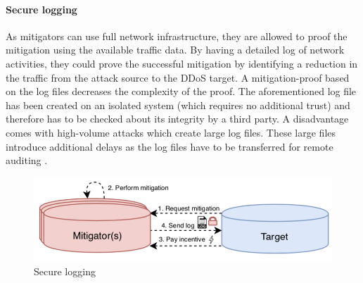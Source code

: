 \paragraph{Secure logging}
As mitigators can use full network infrastructure, they are allowed to proof the mitigation using the available traffic data. By having a detailed log of network activities, they could prove the successful mitigation by identifying a reduction in the traffic from the attack source to the DDoS target. A mitigation-proof based on the log files decreases the complexity of the proof. The aforementioned log file has been created on an isolated system (which requires no additional trust) and therefore has to be checked about its integrity by a third party. A disadvantage comes with high-volume attacks which create large log files. These large files introduce additional delays as the log files have to be transferred for remote auditing \cite{Mannhart2018}.
\begin{figure}[ht]
  \begin{center}
    \includegraphics[scale=0.5]{Talk7/img/ddos/cooperative_network_secure_logging}
  \end{center}
  \caption{Secure logging}
  \label{ddos_secure_logging}
\end{figure}

